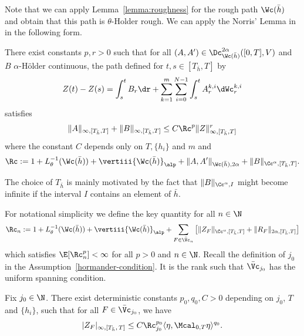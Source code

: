 Note that we can apply Lemma~\ref{lemma:roughness} for the rough path $\Wc(\bar h)$ and obtain that this path is $\theta$-Holder rough. We can apply the Norris' Lemma in~\cite[Theorem~3.1]{HP13} in the following form.

\begin{lemm}\label{norris}
There exist constants $p,r>0$ such that for all $(A,A')\in \Dc_{\Wc(\bar h)}^{2\alpha} ([0,T], V)$ and $B$ $\alpha$-H\"older continuous, the path defined for $t,s\in [T_{\bar h},T]$ by
\begin{equation}\label{eq:norris}
Z(t) -Z(s)= \int_s^t B_r \dr+\sum_{k=1}^m \sum_{i=0}^{N-1} \int_s^t A^{k,i}_r \dWc_r^{k,i}
\end{equation}
satisfies
\[
\Vert A\Vert_{\infty, [T_{\bar h},T]} + \Vert B\Vert_{\infty, [T_{\bar h},T]} \leq C \Rc^p \Vert Z\Vert_{\infty, [T_{\bar h},T]}^r
\]
where the constant $C$ depends only on $T,\{h_i\}$ and $m$ and
\[
\Rc:=1+L_\theta^{-1}(\Wc(\bar h))+\vertiii{ \Wc(\bar h)}_\alp+\Vert A,A'\Vert_{ \Wc(\bar h),2\alpha}+\Vert B\Vert_{\Cc^\alpha,[T_{\bar h},T]}.
\]
\end{lemm}

The choice of $T_{\bar h}$ is mainly motivated by the fact that $\Vert B\Vert_{\Cc^\alpha,I}$ might become infinite if the interval $I$ contains an element of $\bar h$.

For notational simplicity we define the key quantity for all $n\in \N$
\begin{equation}
\Rc_n := 1+L_\theta^{-1}(\Wc(\bar h))+\vertiii{ \Wc(\bar h)}_\alp +
\sum_{{F\in \bar \Vc_n}} \left[\|Z_{F} \|_{\Cc^\alpha,[T_{\bar h},T]} + \|R_{F}\|_{2\alpha,[T_{\bar h},T]} \right]
\end{equation}
which satisfies $\E[\Rc^p_n]<\infty$ for all $p>0$ and $n\in\N$. Recall the definition of $j_0$ in the Assumption~\ref{hormander-condition}. It is the rank such that $\bar{\Vc}_{j_0}$ has the uniform spanning condition.

\begin{lemma}\label{lem-control-derivative1}
Fix $j_0 \in \N$. There exist deterministic constants $p_0,q_0,C>0$ depending on $j_0$, $T$ and $\{h_i\}$, such that for all $F\in \bar \Vc_{j_0}$, we have
\begin{equation}\label{eq:zfj0}
|Z_F|_{\infty, [T_{\bar h},\,T]} \leq C\Rc_{j_0}^{p_0}\langle \eta, \Mcal_{0,T} \eta \rangle^{q_0}.
\end{equation}
\end{lemma}


